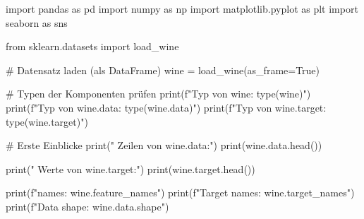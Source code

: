 import pandas as pd
import numpy as np
import matplotlib.pyplot as plt
import seaborn as sns

from sklearn.datasets import load_wine

# Datensatz laden (als DataFrame)
wine = load_wine(as_frame=True)

# Typen der Komponenten prüfen
print(f"Typ von wine: {type(wine)}")
print(f"Typ von wine.data: {type(wine.data)}")
print(f"Typ von wine.target: {type(wine.target)}")

# Erste Einblicke
print(" Zeilen von wine.data:")
print(wine.data.head())

print(" Werte von wine.target:")
print(wine.target.head())

print(f"\nFeature names: {wine.feature_names}")
print(f"Target names: {wine.target_names}")
print(f"Data shape: {wine.data.shape}")